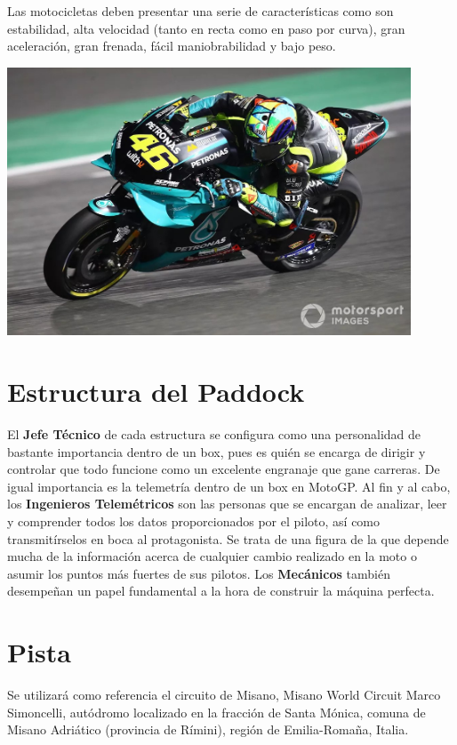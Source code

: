 \documentclass[12pt, letterpaper,spanish]{article}
\theoremstyle{definition}
\theoremstyle{remark}
\begin{document}
	Las motocicletas deben presentar una serie de características como son estabilidad, alta velocidad (tanto en recta como en paso por curva), gran aceleración, gran frenada, fácil maniobrabilidad y bajo peso.
	
	\begin{center}
		\includegraphics[width = 12cm]{imagen1} 
	\end{center}	
	
\section{Estructura del Paddock}
	El \textbf{Jefe Técnico} de cada estructura se configura como una personalidad de bastante importancia dentro de un box, pues es quién se encarga de dirigir y controlar que todo funcione como un excelente engranaje que gane carreras. De igual importancia es la telemetría dentro de un box en MotoGP. Al fin y al cabo, los \textbf{Ingenieros Telemétricos} son las personas que se encargan de analizar, leer y comprender todos los datos proporcionados por el piloto, así como transmitírselos en boca al protagonista. Se trata de una figura de la que depende mucha de la información acerca de cualquier cambio realizado en la moto o asumir los puntos más fuertes de sus pilotos. Los \textbf{Mecánicos} también desempeñan un papel fundamental a la hora de construir la máquina perfecta.

\section{Pista}
	Se utilizará como referencia el circuito de Misano, Misano World Circuit Marco Simoncelli, autódromo localizado en la fracción de Santa Mónica, comuna de Misano Adriático (provincia de Rímini), región de Emilia-Romaña, Italia. 
	
\end{document}
